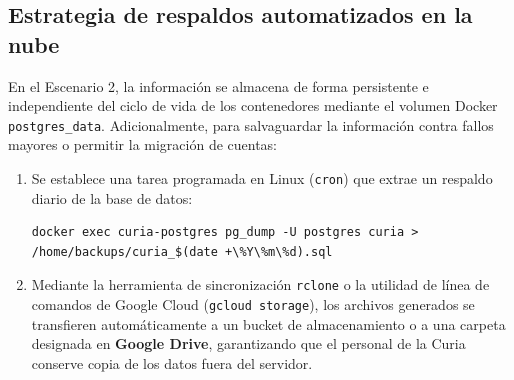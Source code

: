 \subsection{Estrategia de respaldos automatizados en la nube}
En el Escenario 2, la información se almacena de forma persistente e independiente del ciclo de vida de los contenedores mediante el volumen Docker \texttt{postgres\_data}. Adicionalmente, para salvaguardar la información contra fallos mayores o permitir la migración de cuentas:
\begin{enumerate}
    \item Se establece una tarea programada en Linux (\texttt{cron}) que extrae un respaldo diario de la base de datos:
    \begin{lstlisting}[style=consola]
docker exec curia-postgres pg_dump -U postgres curia > /home/backups/curia_$(date +\%Y\%m\%d).sql
\end{lstlisting}
    \item Mediante la herramienta de sincronización \texttt{rclone} o la utilidad de línea de comandos de Google Cloud (\texttt{gcloud storage}), los archivos generados se transfieren automáticamente a un bucket de almacenamiento o a una carpeta designada en \textbf{Google Drive}, garantizando que el personal de la Curia conserve copia de los datos fuera del servidor.
\end{enumerate}